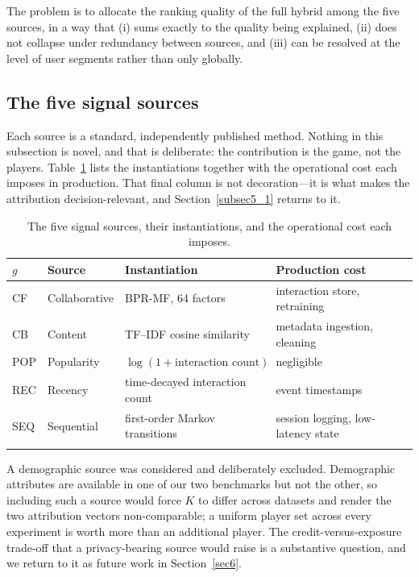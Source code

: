 \documentclass[pdflatex,sn-mathphys-num]{sn-jnl}%
\theoremstyle{thmstyleone}%
\theoremstyle{thmstyletwo}%
\theoremstyle{thmstylethree}%
\begin{document}
The problem is to allocate the ranking quality of the full hybrid among the five sources, in a way that (i) sums exactly to the quality being explained, (ii) does not collapse under redundancy between sources, and (iii) can be resolved at the level of user segments rather than only globally.

\subsection{The five signal sources}\label{subsec3_2}

Each source is a standard, independently published method. Nothing in this subsection is novel, and that is deliberate: the contribution is the game, not the players. Table~\ref{tab3} lists the instantiations together with the operational cost each imposes in production. That final column is not decoration---it is what makes the attribution decision-relevant, and Section~\ref{subsec5_1} returns to it.

\begin{table}[t]
\caption{The five signal sources, their instantiations, and the operational cost each imposes.}\label{tab3}
\begin{tabular}{@{}llll@{}}
\toprule
$g$ & Source & Instantiation & Production cost \\
\midrule
CF  & Collaborative & BPR-MF, 64 factors \cite{rendle2009}    & interaction store, retraining \\
CB  & Content       & TF--IDF cosine similarity \cite{salton1988} & metadata ingestion, cleaning \\
POP & Popularity    & $\log(1+\text{interaction count})$      & negligible \\
REC & Recency       & time-decayed interaction count          & event timestamps \\
SEQ & Sequential    & first-order Markov transitions \cite{rendle2010} & session logging, low-latency state \\
\botrule
\end{tabular}
\end{table}

A demographic source was considered and deliberately excluded. Demographic attributes are available in one of our two benchmarks but not the other, so including such a source would force $K$ to differ across datasets and render the two attribution vectors non-comparable; a uniform player set across every experiment is worth more than an additional player. The credit-versus-exposure trade-off that a privacy-bearing source would raise is a substantive question, and we return to it as future work in Section~\ref{sec6}.
\end{document}

